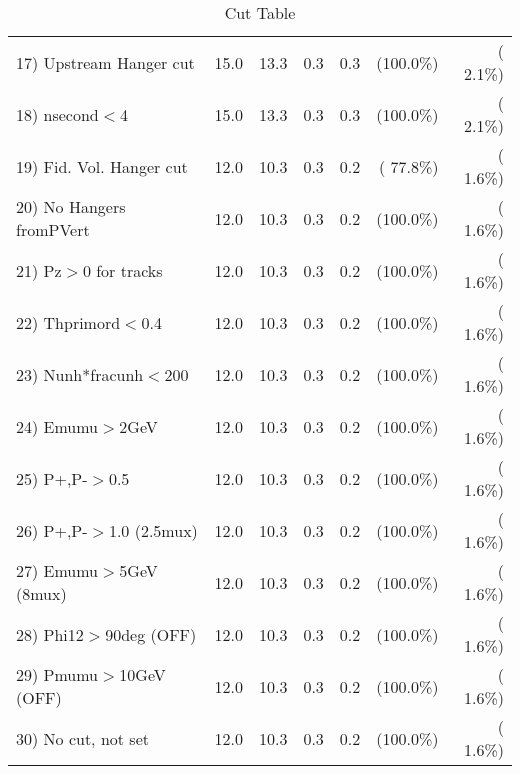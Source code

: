 \begin{table}[h!]
\begin{tabular}{||l||r|r|r|r|r|r||}
 17) Upstream Hanger cut  &         15.0 &         13.3 &          0.3 &          0.3 & (100.0\%) & (  2.1\%) \\
 18) nsecond$<$4          &         15.0 &         13.3 &          0.3 &          0.3 & (100.0\%) & (  2.1\%) \\
 19) Fid. Vol. Hanger cut &         12.0 &         10.3 &          0.3 &          0.2 & ( 77.8\%) & (  1.6\%) \\
 20) No Hangers fromPVert &         12.0 &         10.3 &          0.3 &          0.2 & (100.0\%) & (  1.6\%) \\
 21) Pz$>$0 for tracks    &         12.0 &         10.3 &          0.3 &          0.2 & (100.0\%) & (  1.6\%) \\
 22) Thprimord$<$0.4      &         12.0 &         10.3 &          0.3 &          0.2 & (100.0\%) & (  1.6\%) \\
 23) Nunh*fracunh$<$200   &         12.0 &         10.3 &          0.3 &          0.2 & (100.0\%) & (  1.6\%) \\
 24) Emumu$>$2GeV         &         12.0 &         10.3 &          0.3 &          0.2 & (100.0\%) & (  1.6\%) \\
 25) P+,P-$>$0.5          &         12.0 &         10.3 &          0.3 &          0.2 & (100.0\%) & (  1.6\%) \\
 26) P+,P-$>$1.0 (2.5mux) &         12.0 &         10.3 &          0.3 &          0.2 & (100.0\%) & (  1.6\%) \\
 27) Emumu$>$5GeV  (8mux) &         12.0 &         10.3 &          0.3 &          0.2 & (100.0\%) & (  1.6\%) \\
 28) Phi12$>$90deg  (OFF) &         12.0 &         10.3 &          0.3 &          0.2 & (100.0\%) & (  1.6\%) \\
 29) Pmumu$>$10GeV  (OFF) &         12.0 &         10.3 &          0.3 &          0.2 & (100.0\%) & (  1.6\%) \\
 30) No cut, not set      &         12.0 &         10.3 &          0.3 &          0.2 & (100.0\%) & (  1.6\%) \\
 \hline
 \hline
 \end{tabular}
 \caption{Cut Table           }
 \label{tab-cutcohjpsi-mumu_cohpip}
 \end{table}
